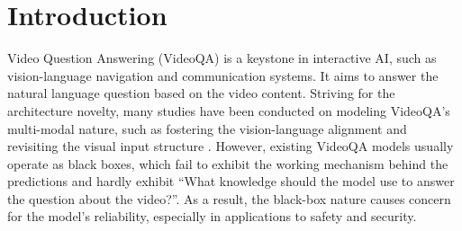 \section{Introduction}
\label{sec:introduction}


Video Question Answering (VideoQA) \cite{fan2019heterogeneous} is a keystone in interactive AI, such as vision-language navigation and communication systems.
It aims to answer the natural language question based on the video content.
Striving for the architecture novelty, many studies have been conducted on modeling VideoQA's multi-modal nature, such as fostering the vision-language alignment \cite{jiang2020reasoning,park2021bridge} and revisiting the visual input structure \cite{le2021hierarchical,dang2021hierarchical}.
However, existing VideoQA models usually operate as black boxes, which fail to exhibit the working mechanism behind the predictions and hardly exhibit ``What knowledge should the model use to answer the question about the video?''.
As a result, the black-box nature causes concern for the model's reliability, especially in applications to safety and security.



